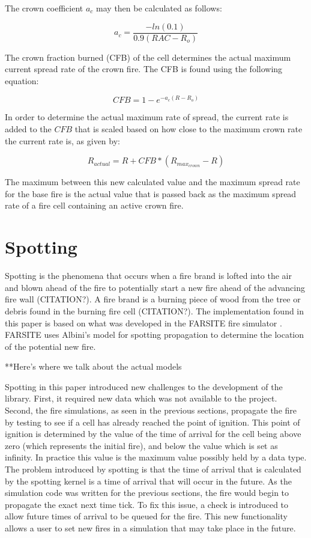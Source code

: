 The crown coefficient $a_c$ may then be calculated as follows:

\begin{equation}
a_c = \frac{-ln(0.1)}{0.9(RAC - R_o)}
\end{equation}

The crown fraction burned (CFB) of the cell determines the actual maximum current spread rate of the crown fire. The CFB is found using the following equation: 

\begin{equation}
CFB = 1 - e^{-a_c(R-R_o)}
\end{equation}

In order to determine the actual maximum rate of spread, the current rate is added to the $CFB$ that is scaled based on how close to the maximum crown rate the current rate is, as given by: 

\begin{equation}
R_{actual} = R + CFB * (R_{max_{crown}} - R)
\end{equation}

The maximum between this new calculated value and the maximum spread rate for the base fire is the actual value that is passed back as the maximum spread rate of a fire cell containing an active crown fire. 

\section{Spotting}
Spotting is the phenomena that occurs when a fire brand is lofted into the air and blown ahead of the fire to potentially start a new fire ahead of the advancing fire wall (CITATION?). A fire brand is a burning piece of wood from the tree or debris found in the burning fire cell (CITATION?). The implementation found in this paper is based on what was developed in the FARSITE fire simulator \cite{FARSITE}. FARSITE uses Albini's model for spotting propagation to determine the location of the potential new fire. 

**Here's where we talk about the actual models

Spotting in this paper introduced new challenges to the development of the library. First, it required new data which was not available to the project. Second, the fire simulations, as seen in the previous sections, propagate the fire by testing to see if a cell has already reached the point of ignition. This point of ignition is determined by the value of the time of arrival for the cell being above zero (which represents the initial fire), and below the value which is set as infinity. In practice this value is the maximum value possibly held by a data type. The problem introduced by spotting is that the time of arrival that is calculated by the spotting kernel is a time of arrival that will occur in the future. As the simulation code was written for the previous sections, the fire would begin to propagate the exact next time tick. To fix this issue, a check is introduced to allow future times of arrival to be queued for the fire. This new functionality allows a user to set new fires in a simulation that may take place in the future. 


